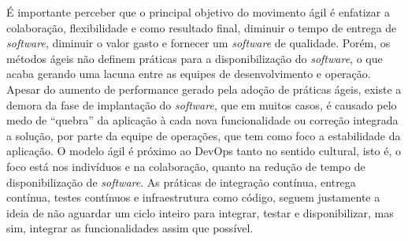 \documentclass[twoside,english,brazilian]{UNISINOSartigo}
\begin{document}
É importante perceber que o principal objetivo do movimento ágil é enfatizar a colaboração, flexibilidade e como resultado final, diminuir o tempo de entrega de \textit{software}, diminuir o valor gasto e fornecer um \textit{software} de qualidade. Porém, os métodos ágeis não definem práticas para a disponibilização do \textit{software}, o que acaba gerando uma lacuna entre as equipes de desenvolvimento e operação. Apesar do aumento de performance gerado pela adoção de práticas ágeis, existe a demora da fase de implantação do \textit{software}, que em muitos casos, é causado pelo medo de ``quebra'' da aplicação à cada nova funcionalidade ou correção integrada a solução, por parte da equipe de operações, que tem como foco a estabilidade da aplicação.
O modelo ágil é próximo ao DevOps tanto no sentido cultural, isto é, o foco está nos indivíduos e na colaboração, quanto na redução de tempo de disponibilização de \textit{software}. As práticas de integração contínua, entrega contínua, testes contínuos e  infraestrutura como código, seguem justamente a ideia de não aguardar um ciclo inteiro para integrar, testar e disponibilizar, mas sim, integrar as funcionalidades assim que possível.

\end{document}
